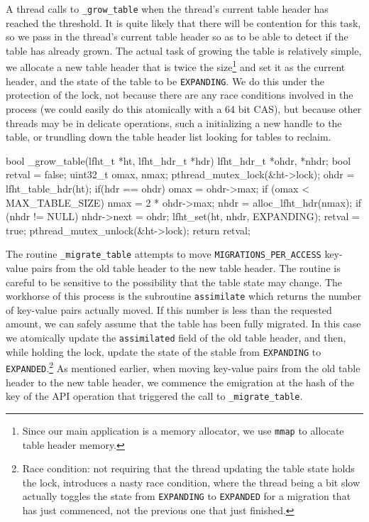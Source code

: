 A thread calls to \texttt{\_grow\_table} when the thread's current table header has reached
the threshold. It is quite likely that there will be contention for this task, so 
we pass in the thread's current table header so as to be able to detect if the table
has already grown. The actual task of growing the table is relatively simple, we allocate
a new table header that is twice the size\footnote{Since our main application is a memory
allocator, we use \texttt{mmap} to allocate table header memory.}
and set it as the current header, and the state of the table to be \texttt{EXPANDING}.
We do this under the protection of the lock, not because there are any race conditions
involved in the process (we could easily do this atomically with a 64 bit CAS), but because
other threads may be in delicate operations, such a initializing a new handle to the table,
or trundling down the table header list looking for tables to reclaim.


\begin{center}
\begin{clisting}
bool _grow_table(lfht_t *ht,  lfht_hdr_t *hdr){
  lfht_hdr_t *ohdr, *nhdr;
  bool retval = false;
  uint32_t omax, nmax;
  pthread_mutex_lock(&ht->lock);
  ohdr = lfht_table_hdr(ht);
  if(hdr == ohdr){
    omax = ohdr->max;
    if (omax < MAX_TABLE_SIZE) {
      nmax = 2 * ohdr->max;
      nhdr  = alloc_lfht_hdr(nmax);
      if (nhdr != NULL){
	nhdr->next = ohdr;
	lfht_set(ht, nhdr, EXPANDING);
	retval = true;
      }
    }
  }
  pthread_mutex_unlock(&ht->lock);
  return retval;
}

\end{clisting}
\end{center}

The routine \texttt{\_migrate\_table} attempts to move \texttt{MIGRATIONS\_PER\_ACCESS} key-value
pairs from the old table header to the new table header. The routine is careful to be sensitive to
the possibility that the table state may change.
The workhorse of this process
is the subroutine  \texttt{assimilate} which returns the number of key-value pairs actually moved.
If this number is less than the requested amount, we can safely assume that the table has been
fully migrated. In this case we atomically update the \texttt{assimilated} field of the old table header,
and then, while holding the lock, update the state of the stable from \texttt{EXPANDING} to
\texttt{EXPANDED}.\footnote{Race condition: not requiring that the thread updating the
  table state holds the lock, introduces a nasty race condition, where the thread being a bit slow
  actually toggles the state from \texttt{EXPANDING} to \texttt{EXPANDED} for a migration that
  has just commenced, not the previous one that just finished.}
As mentioned earlier, when moving key-value pairs from the old table header to the new table header, we
commence the emigration at the hash of the key of the API operation that triggered the call to \texttt{\_migrate\_table}.




